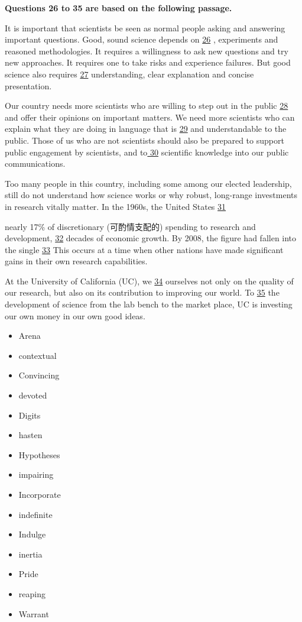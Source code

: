 \documentclass[UTF8,11pt]{ctexart}
\begin{document}
\textbf{Questions 26 to 35 are based on the following passage.}


It is important that scientists be seen as normal people asking and answering important questions. Good, sound science depends on \uline{26} , experiments and reasoned methodologies. It requires a willingness to ask new questions and try new approaches. It requires one to take risks and experience failures. But good science also requires \uline{27} understanding, clear explanation and concise presentation.


Our country needs more scientists who are willing to step out in the public \uline{28} and offer their opinions on important matters. We need more scientists who can explain what they are doing in language that is \uline{29} and understandable to the public. Those of us who are not scientists should also be prepared to support public engagement by scientists, and to\uline{ 30} scientific knowledge into our public communications.


Too many people in this country, including some among our elected leadership, still do not understand how science works or why robust, long-range investments in research vitally matter. In the 1960s, the United States \uline{31}


nearly 17\% of discretionary (可酌情支配的) spending to research and development, \uline{32} decades of economic growth. By 2008, the figure had fallen into the single \uline{33} This occurs at a time when other nations have made significant gains in their own research capabilities.


At the University of California (UC), we \uline{34} ourselves not only on the quality of our research, but also on its contribution to improving our world. To \uline{35} the development of science from the lab bench to the market place, UC is investing our own money in our own good ideas.


\begin{itemize}[leftmargin=2em,itemsep=.2em,topsep=.4em]\item[A.] Arena
\item[B.] contextual
\item[C.] Convincing
\item[D.] devoted
\item[E.] Digits
\item[F.] hasten
\item[G.] Hypotheses
\item[H.] impairing
\item[I.] Incorporate
\item[J.] indefinite
\item[K.] Indulge
\item[L.] inertia
\item[M.] Pride
\item[N.] reaping
\item[O.] Warrant
\end{itemize}
\end{document}
